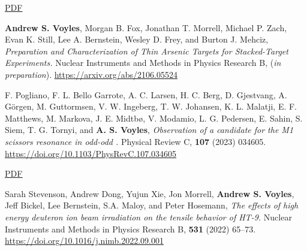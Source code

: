 \begin{bibsection}
\ifshort \vspace{0.1cm} \href{https://avoyles.github.io/papers/Neudecker2023_UQ_Short.pdf}{\underline{PDF}} \else  \fi 



\item \textbf{Andrew S. Voyles}, Morgan B. Fox, Jonathan T. Morrell, Michael P. Zach, Evan K. Still, Lee A. Bernstein, Wesley D. Frey, and Burton J. Mehciz, \emph{Preparation and Characterization of Thin Arsenic Targets for Stacked-Target Experiments.} Nuclear Instruments and Methods in Physics Research  B,  (\emph{in preparation}). \url{https://arxiv.org/abs/2106.05524} 









\item F. Pogliano, F. L. Bello Garrote, A. C. Larsen, H. C. Berg, D. Gjestvang, A. Görgen, M. Guttormsen, V. W. Ingeberg, T. W. Johansen, K. L. Malatji, E. F. Matthews, M. Markova, J. E. Midtbø, V. Modamio, L. G. Pedersen, E. Sahin, S. Siem, T. G. Tornyi, and \textbf{A. S. Voyles}, \emph{Observation of a candidate for the M1 scissors resonance in odd-odd .} Physical Review C, \textbf{107} (2023) 034605. \url{https://doi.org/10.1103/PhysRevC.107.034605} 

\ifshort \vspace{0.1cm} \href{https://avoyles.github.io/papers/Pogliano2023_166Ho.pdf}{\underline{PDF}} \else  \fi 


\item Sarah Stevenson, Andrew Dong, Yujun Xie, Jon Morrell, \textbf{Andrew S. Voyles}, Jeff Bickel, Lee Bernstein, S.A. Maloy, and Peter Hosemann, \emph{The effects of high energy deuteron ion beam irradiation on the tensile behavior of HT-9.} Nuclear Instruments and Methods in Physics Research  B, \textbf{531} (2022) 65--73. \url{https://doi.org/10.1016/j.nimb.2022.09.001} 


\end{bibsection}
